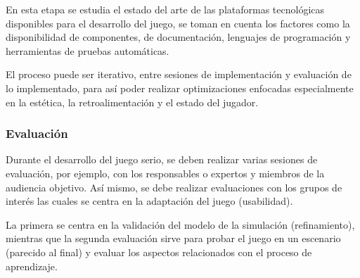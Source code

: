 En esta etapa se estudia el estado del arte de las plataformas tecnológicas
disponibles para el desarrollo del juego, se toman en cuenta los factores como
la disponibilidad de componentes, de documentación, lenguajes de programación y
herramientas de pruebas automáticas.

El proceso puede ser iterativo, entre sesiones de implementación y evaluación de
lo implementado, para así poder realizar optimizaciones enfocadas especialmente
en la estética, la retroalimentación y el estado del jugador.

\subsubsection{Evaluación} 

Durante el desarrollo del juego serio, se deben realizar varias sesiones de
evaluación, por ejemplo, con los responsables o expertos y miembros de la
audiencia objetivo. Así mismo, se debe realizar evaluaciones con los grupos de
interés las cuales se centra en la adaptación del juego (usabilidad). 

La primera se centra en la validación del modelo de la simulación
(refinamiento), mientras que la segunda evaluación sirve para probar el juego en
un escenario (parecido al final) y evaluar los aspectos relacionados con el
proceso de aprendizaje.  
